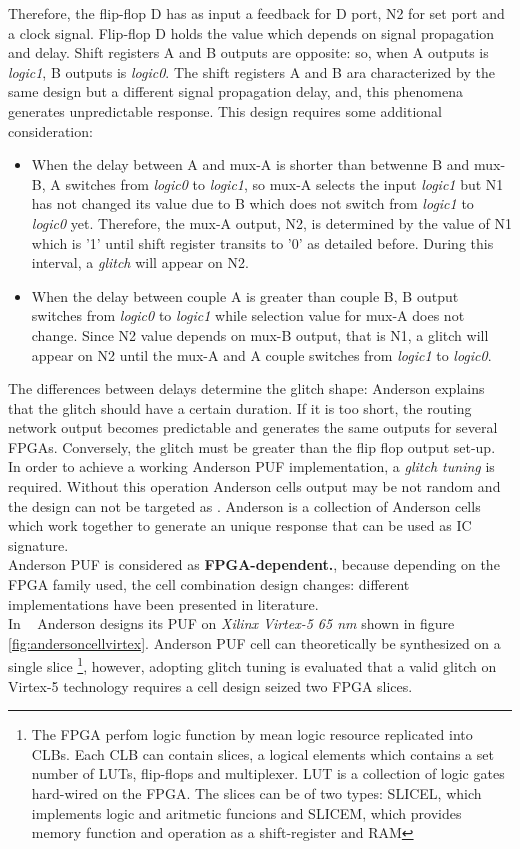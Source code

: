 \documentclass[../tesi.tex]{subfiles}
\begin{document}
Therefore, the flip-flop D has as input a feedback for D port, N2 for set port and a clock signal. Flip-flop D holds the value which depends on signal propagation and delay. Shift registers A and B outputs are opposite: so, when A outputs is \emph{logic1}, B outputs is \emph{logic0}. The shift registers A and B ara characterized by the same design but a different signal propagation delay, and, this phenomena generates \puf{} unpredictable response. This design requires some additional consideration: 
\begin{itemize}
\item When the delay between A and mux-A is shorter than betwenne B and mux-B, A switches from \emph{logic0} to \emph{logic1}, so mux-A selects the input \emph{logic1} but N1 has not changed its value due to B which does not switch from \emph{logic1} to \emph{logic0} yet.
Therefore, the mux-A output, N2, is determined by the value of N1 which is '1' until shift register transits to '0' as detailed before. During this interval, a \emph{glitch} will appear on N2. 
\item When the delay between couple A is greater than couple B, B output switches from \emph{logic0} to \emph{logic1} while selection value for mux-A does not change. Since N2 value depends on mux-B output, that is N1, a glitch will appear on N2 until the mux-A and A couple switches from \emph{logic1} to \emph{logic0}. 
\end{itemize} 
The differences between delays determine the glitch shape: Anderson explains that the glitch should have a certain duration. If it is too short, the routing network output becomes predictable and generates the same outputs for several FPGAs.
Conversely, the glitch must be greater than the flip flop output set-up. In order to achieve a working Anderson PUF implementation, a \emph{glitch tuning} is required. Without this operation Anderson cells output may be not random and the design can not be targeted as \puf{}.  
Anderson \puf{} is a collection of Anderson cells which work together to generate an unique response that can be used as IC signature.  \\
Anderson PUF is considered as \textbf{FPGA-dependent.}, because depending on the FPGA family used, the cell combination design changes: different implementations have been presented in literature.  \\
In ~\cite{anderson2010puf} Anderson designs its PUF on \emph{ Xilinx Virtex-5 65 nm} shown in figure \ref{fig:andersoncellvirtex}. Anderson PUF cell can theoretically be synthesized on a single slice \footnote{The FPGA perfom logic function by mean logic resource replicated into CLBs. Each CLB can contain slices, a logical elements which contains a set number of LUTs, flip-flops and multiplexer. LUT is a collection of logic gates hard-wired on the FPGA. The slices can be of two types: SLICEL, which implements logic and aritmetic funcions and SLICEM, which provides memory function and operation as a shift-register and RAM}, however, adopting glitch tuning is evaluated that a valid glitch on Virtex-5 technology requires a cell design seized two FPGA slices.
\end{document}
